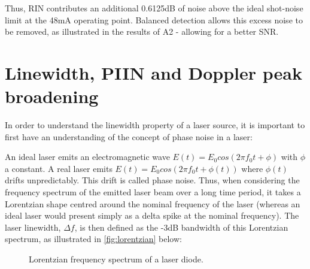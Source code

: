 Thus, RIN contributes an additional 0.6125dB of noise above the ideal shot-noise limit at the 48mA operating point. Balanced detection allows this excess noise to be removed, as illustrated in the results of A2 - allowing for a better SNR.

\section{Linewidth, PIIN and Doppler peak broadening}
\label{appendix:PIIN}
In order to understand the linewidth property of a laser source, it is important to first have an understanding of the concept of phase noise in a laser:

    An ideal laser emits an electromagnetic wave $E(t) = E_0cos(2\pi f_0t + \phi)$ with $\phi$ a constant. A real laser emits $E(t)=E_0cos(2\pi f_0t + \phi(t))$ where $\phi(t)$ drifts unpredictably. This drift is called phase noise. Thus, when considering the frequency spectrum of the emitted laser beam over a long time period, it takes a Lorentzian shape centred around the nominal frequency of the laser (whereas an ideal laser would present simply as a delta spike at the nominal frequency). The laser linewidth, $\Delta f$, is then defined as the -3dB bandwidth of this Lorentzian spectrum, as illustrated in \autoref{fig:lorentzian} below:

    \begin{figure}[H]
    \centering
    \caption{Lorentzian frequency spectrum of a laser diode.}
    \label{fig:lorentzian}
    \end{figure}

